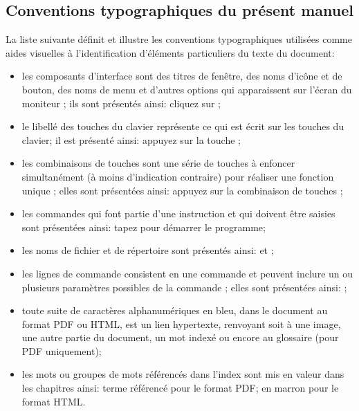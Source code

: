 \subsection{Conventions typographiques du présent manuel\label{introduction-manual-conventions}}

La liste suivante définit et illustre les conventions typographiques utilisées comme aides visuelles à l'identification d'éléments particuliers du texte du document:

\begin{itemize}
	\item les composants d'interface sont des titres de fenêtre, des noms d'icône et de bouton, des noms de menu et d'autres options qui apparaissent sur l'écran du moniteur ; ils sont présentés ainsi:
		\newline
		\hspace*{1.5cm}cliquez sur ;
	\item le libellé des touches du clavier représente ce qui est écrit sur les touches du clavier; il est présenté ainsi:
		\newline
		\hspace*{1.5cm}appuyez sur la touche ;	
	\item les combinaisons de touches sont une série de touches à enfoncer 	simultanément (à moins d'indication contraire) pour réaliser une fonction 	unique ; elles sont présentées ainsi:
		\newline
		\hspace*{1.5cm}appuyez sur la combinaison de touches ;
	\item les commandes qui font partie d'une instruction et qui doivent être saisies sont présentées ainsi:
		\newline
		\hspace*{1.5cm}tapez  pour démarrer le programme;
	\item les noms de fichier et de répertoire sont présentés ainsi:
		\newline
		\hspace*{1.5cm} et ;	
	\item les lignes de commande consistent en une commande et peuvent inclure un ou plusieurs paramètres possibles de la commande ; elles sont présentées ainsi:
		\newline
		\hspace*{1.5cm}	;
	\item toute suite de caractères alphanumériques en bleu, dans le document au format \gls{PDF} ou \gls{HTML}, est un lien hypertexte, renvoyant soit à une image, une autre partie du document, un mot indexé ou encore au glossaire (pour \gls{PDF} uniquement);
	\item les mots ou groupes de mots référencés dans l'index sont mis en valeur dans les chapitres ainsi:
		\newline
		\hspace*{1.5cm}	\textsf{terme référencé} pour le format \gls{PDF};
		\newline 
		\hspace*{1.5cm} en marron pour le format \gls{HTML}. 
\end{itemize}

